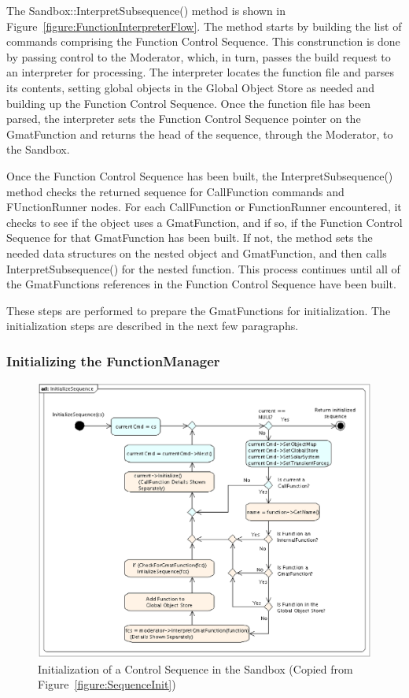 The Sandbox::InterpretSubsequence() method is shown in Figure~\ref{figure:FunctionInterpreterFlow}. 
The method starts by building the list of commands comprising the Function Control Sequence.  
This construnction is done by passing control to the Moderator, which, in turn, passes the build
request to an interpreter for processing.  The interpreter locates the function file and parses its
contents, setting global objects in the Global Object Store as needed and building up the Function
Control Sequence.  Once the function file has been parsed, the interpreter sets the Function Control
Sequence pointer on the GmatFunction and returns the head of the sequence, through the Moderator, to
the Sandbox.

Once the Function Control Sequence has been built, the InterpretSubsequence() method checks the
returned sequence for CallFunction commands and FUnctionRunner nodes.  For each CallFunction or
FunctionRunner encountered, it checks to see if the object uses a GmatFunction, and if so, if
the Function Control Sequence for that GmatFunction has been built.  If not, the method sets the
needed data structures on the nested object and GmatFunction, and then calls InterpretSubsequence()
for the nested function.  This process continues until all of the GmatFunctions references in the
Function Control Sequence have been built.

These steps are performed to prepare the GmatFunctions for initialization.  The initialization
steps are described in the next few paragraphs.

\subsubsection{Initializing the FunctionManager}

\begin{figure}[htb]
\begin{center}
\includegraphics[scale=0.5]{Images/InitializeSequence.eps}
\caption{\label{figure:SequenceInitGmatFunctionRecap}Initialization of a Control Sequence in the
Sandbox (Copied from Figure~\ref{figure:SequenceInit})}
\end{center}
\end{figure}

